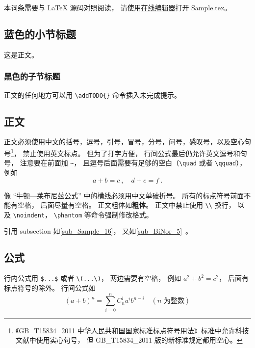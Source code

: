 
\begin{issues}
\issueDraft       %
\issueTODO        %
\issueMissDepend  %
\issueAbstract    %
\issueNeedCite    %
\end{issues}


本词条需要与 LaTeX 源码对照阅读， 请使用\href{https://wuli.wiki/editor}{在线编辑器}打开 Sample.tex。

\subsection{蓝色的小节标题}
这是正文。
\subsubsection{黑色的子节标题}
正文的任何地方可以用 \verb|\addTODO{}| 命令插入未完成提示。

\subsection{正文}\label{sub_Sample_16}
正文必须使用中文的括号，逗号，引号，冒号，分号，问号，感叹号，以及空心句号\footnote{《GB\_T15834\_2011 中华人民共和国国家标准标点符号用法》标准中允许科技文献中使用实心句号， 但 GB\_T15834\_2011 版的新标准规定都用空心。}， 禁止使用英文标点。 但为了打字方便， 行间公式最后仍允许英文逗号和句号， 注意要在前面加 \verb|~|， 且逗号后面需要有足够的空白（\verb|\quad| 或者 \verb|\qquad|）， 例如
\begin{equation}\label{eq_Sample_2}
a + b = c~, \quad d + e = f~.
\end{equation}


像 “牛顿—莱布尼兹公式” 中的横线必须用中文单破折号。 所有的标点符号前面不能有空格， 后面尽量有空格。 正文粗体如\textbf{粗体}。 正文中禁止使用 \verb|\\| 换行， 以及 \verb|\noindent|， \verb|\phantom| 等命令强制修改格式。

引用 subsection 如\autoref{sub_Sample_16}， 又如\autoref{sub_BiNor_5}~。

\subsection{公式}
行内公式用 \verb|$...$| 或者 \verb|\(...\)|， 两边需要有空格， 例如 $a^2+b^2=c^2$， 后面有标点符号的除外。 行间公式如
\begin{equation}\label{eq_Sample_1}
(a+b)^n = \sum_{i=0}^n C_n^i a^i b^{n-i} \quad (\text{$n$ 为整数})
\end{equation}




